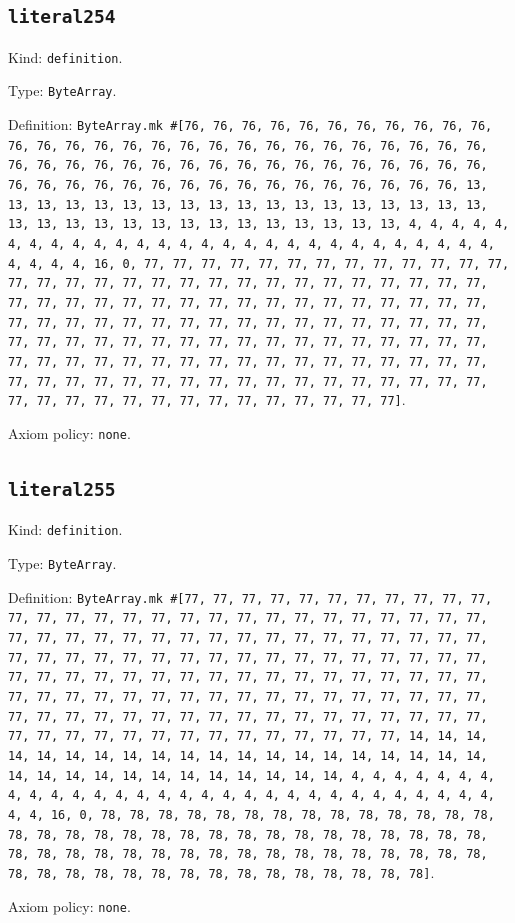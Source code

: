 \documentclass[11pt]{article}
\begin{document}
\subsection*{\texttt{literal254}}
\noindent Kind: \texttt{definition}.\par
\noindent Type: \texttt{ByteArray}.\par
\noindent Definition: \texttt{ByteArray.mk \#[76, 76, 76, 76, 76, 76, 76, 76, 76, 76, 76, 76, 76, 76, 76, 76, 76, 76, 76, 76, 76, 76, 76, 76, 76, 76, 76, 76, 76, 76, 76, 76, 76, 76, 76, 76, 76, 76, 76, 76, 76, 76, 76, 76, 76, 76, 76, 76, 76, 76, 76, 76, 76, 76, 76, 76, 76, 76, 76, 76, 76, 13, 13, 13, 13, 13, 13, 13, 13, 13, 13, 13, 13, 13, 13, 13, 13, 13, 13, 13, 13, 13, 13, 13, 13, 13, 13, 13, 13, 13, 13, 13, 13, 4, 4, 4, 4, 4, 4, 4, 4, 4, 4, 4, 4, 4, 4, 4, 4, 4, 4, 4, 4, 4, 4, 4, 4, 4, 4, 4, 4, 4, 4, 4, 4, 16, 0, 77, 77, 77, 77, 77, 77, 77, 77, 77, 77, 77, 77, 77, 77, 77, 77, 77, 77, 77, 77, 77, 77, 77, 77, 77, 77, 77, 77, 77, 77, 77, 77, 77, 77, 77, 77, 77, 77, 77, 77, 77, 77, 77, 77, 77, 77, 77, 77, 77, 77, 77, 77, 77, 77, 77, 77, 77, 77, 77, 77, 77, 77, 77, 77, 77, 77, 77, 77, 77, 77, 77, 77, 77, 77, 77, 77, 77, 77, 77, 77, 77, 77, 77, 77, 77, 77, 77, 77, 77, 77, 77, 77, 77, 77, 77, 77, 77, 77, 77, 77, 77, 77, 77, 77, 77, 77, 77, 77, 77, 77, 77, 77, 77, 77, 77, 77, 77, 77, 77, 77, 77, 77, 77, 77, 77, 77, 77, 77, 77]}.\par
\noindent Axiom policy: \texttt{none}.\par
\subsection*{\texttt{literal255}}
\noindent Kind: \texttt{definition}.\par
\noindent Type: \texttt{ByteArray}.\par
\noindent Definition: \texttt{ByteArray.mk \#[77, 77, 77, 77, 77, 77, 77, 77, 77, 77, 77, 77, 77, 77, 77, 77, 77, 77, 77, 77, 77, 77, 77, 77, 77, 77, 77, 77, 77, 77, 77, 77, 77, 77, 77, 77, 77, 77, 77, 77, 77, 77, 77, 77, 77, 77, 77, 77, 77, 77, 77, 77, 77, 77, 77, 77, 77, 77, 77, 77, 77, 77, 77, 77, 77, 77, 77, 77, 77, 77, 77, 77, 77, 77, 77, 77, 77, 77, 77, 77, 77, 77, 77, 77, 77, 77, 77, 77, 77, 77, 77, 77, 77, 77, 77, 77, 77, 77, 77, 77, 77, 77, 77, 77, 77, 77, 77, 77, 77, 77, 77, 77, 77, 77, 77, 77, 77, 77, 77, 77, 77, 77, 77, 77, 77, 77, 77, 14, 14, 14, 14, 14, 14, 14, 14, 14, 14, 14, 14, 14, 14, 14, 14, 14, 14, 14, 14, 14, 14, 14, 14, 14, 14, 14, 14, 14, 14, 14, 14, 4, 4, 4, 4, 4, 4, 4, 4, 4, 4, 4, 4, 4, 4, 4, 4, 4, 4, 4, 4, 4, 4, 4, 4, 4, 4, 4, 4, 4, 4, 4, 4, 16, 0, 78, 78, 78, 78, 78, 78, 78, 78, 78, 78, 78, 78, 78, 78, 78, 78, 78, 78, 78, 78, 78, 78, 78, 78, 78, 78, 78, 78, 78, 78, 78, 78, 78, 78, 78, 78, 78, 78, 78, 78, 78, 78, 78, 78, 78, 78, 78, 78, 78, 78, 78, 78, 78, 78, 78, 78, 78, 78, 78, 78, 78, 78, 78]}.\par
\noindent Axiom policy: \texttt{none}.\par
\end{document}
